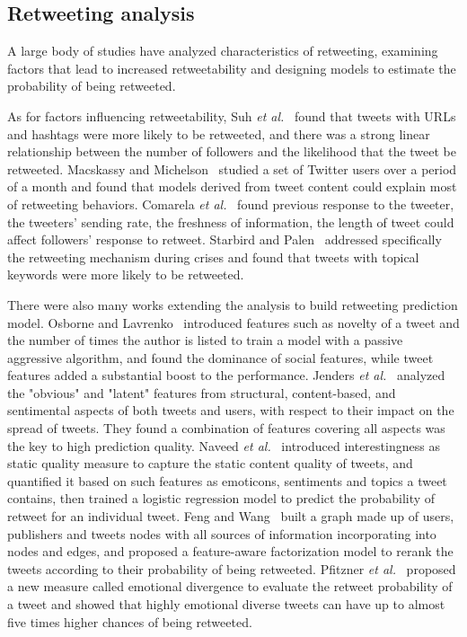 \documentclass{acm_proc_article-sp}
\begin{document}
\subsection{Retweeting analysis}
A large body of studies have analyzed characteristics of retweeting, examining factors that lead to increased retweetability and designing models to estimate the probability of being retweeted. 

As for factors influencing retweetability, Suh \emph{et al.}~\cite{Suh2010} found that tweets with URLs and hashtags were more likely to be retweeted, and there was a strong linear relationship between the number of followers and the likelihood that the tweet be retweeted. 
Macskassy and Michelson~\cite{conf/icwsm/MacskassyM11} studied a set of Twitter users over a period of a month and found that models derived from tweet content could explain most of retweeting behaviors.
Comarela \emph{et al.}~\cite{Comarela:2012UFA} found previous response to the tweeter, the tweeters’ sending rate, the freshness of information, the length of tweet could affect followers’ response to retweet. 
Starbird and Palen~\cite{Starbird:2012RRI} addressed specifically the retweeting mechanism during crises and found that tweets with topical keywords were more likely to be retweeted. 

There were also many works extending the analysis to build retweeting prediction model. 
Osborne and Lavrenko~\cite{Osborne_Lavrenko_2011} introduced features such as novelty of a tweet and the number of times the author is listed to train a model with a passive aggressive algorithm, and found the dominance of social features, while tweet features added a substantial boost to the performance.
Jenders \emph{et al.}~\cite{Jenders:2013APV} analyzed the "obvious" and "latent" features from structural, content-based, and sentimental aspects of both tweets and users, with respect to their impact on the spread of tweets. 
They found a combination of features covering all aspects was the key to high prediction quality.
Naveed \emph{et al.}~\cite{Naveed:2011SMC,2011:NaveedGKC} introduced interestingness as static quality measure to capture the static content quality of tweets, and quantified it based on such features as emoticons, sentiments and topics a tweet contains, then trained a logistic regression model to predict the probability of retweet for an individual tweet.
Feng and Wang~\cite{conf/wsdm/FengW13} built a graph made up of users, publishers and tweets nodes with all sources of information incorporating into nodes and edges, and proposed a feature-aware factorization model to rerank the tweets according to their probability of being retweeted.
Pfitzner \emph{et al.}~\cite{conf/icwsm/PfitznerGS12} proposed a new measure called emotional divergence to evaluate the retweet probability of a tweet and showed that highly emotional diverse tweets can have up to almost five times higher chances of being retweeted.
\end{document}
